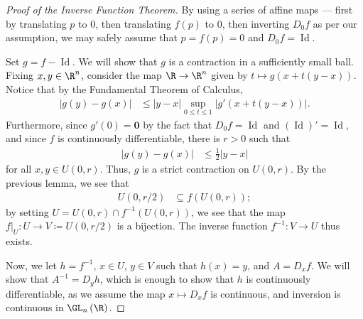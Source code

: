 \documentclass[10pt]{mypackage}
\begin{document}
\begin{proof}[Proof of the Inverse Function Theorem]
  By using a series of affine maps --- first by translating $p$ to $0$, then translating $f(p)$ to $0$, then inverting $D_0f$ as per our assumption, we may safely assume that $p = f(p) =0$ and $D_0f = \operatorname{Id}$.\newline

  Set $g = f - \operatorname{Id}$. We will show that $g$ is a contraction in a sufficiently small ball. Fixing $x,y\in \R^n$, consider the map $\R\rightarrow \R^n$ given by $t \mapsto g\left( x + t\left( y-x \right) \right)$. Notice that by the Fundamental Theorem of Calculus,
  \begin{align*}
    \left\vert g(y)-g(x) \right\vert &\leq \left\vert y-x \right\vert \sup_{0\leq t \leq 1} \left\vert g'\left( x + t\left( y-x \right) \right) \right\vert.
  \end{align*}
  Furthermore, since $g'(0) = \mathbf{0}$ by the fact that $D_0f = \operatorname{Id}$ and $\left( \operatorname{Id} \right)' = \operatorname{Id}$, and since $f$ is continuously differentiable, there is $r > 0$ such that
  \begin{align*}
    \left\vert g(y)-g(x) \right\vert &\leq \frac{1}{2}\left\vert y-x \right\vert
  \end{align*}
  for all $x,y\in U\left( 0,r \right)$. Thus, $g$ is a strict contraction on $U\left( 0,r \right)$. By the previous lemma, we see that
  \begin{align*}
    U\left( 0,r/2 \right) &\subseteq f\left( U\left( 0,r \right) \right);
  \end{align*}
  by setting $U = U\left( 0,r \right) \cap f^{-1}\left( U\left( 0,r \right) \right)$, we see that the map $f|_{U}\colon U\rightarrow V \coloneq U\left( 0,r/2 \right)$ is a bijection. The inverse function $f^{-1}\colon V\rightarrow U$ thus exists.\newline

  Now, we let $h = f^{-1}$, $x\in U$, $y\in V$ such that $h(x) = y$, and $A = D_xf$. We will show that $A^{-1} = D_yh$, which is enough to show that $h$ is continuously differentiable, as we assume the map $x \mapsto D_xf$ is continuous, and inversion is continuous in $\GL_n\left(\R\right)$.\newline


\end{proof}
\end{document}
